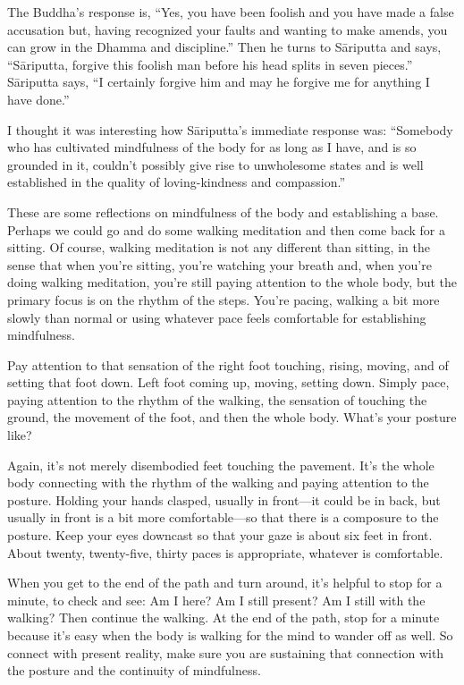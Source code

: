 The Buddha’s response is, “Yes, you have been foolish and you have made
a false accusation but, having recognized your faults and wanting to
make amends, you can grow in the Dhamma and discipline.” Then he turns
to Sāriputta and says, “Sāriputta, forgive this foolish man before his
head splits in seven pieces.” Sāriputta says, “I certainly forgive him
and may he forgive me for anything I have done.”

I thought it was interesting how Sāriputta’s immediate response was:
“Somebody who has cultivated mindfulness of the body for as long as I
have, and is so grounded in it, couldn’t possibly give rise to
unwholesome states and is well established in the quality of
loving-kindness and compassion.”

These are some reflections on mindfulness of the body and establishing a
base. Perhaps we could go and do some walking meditation and then come
back for a sitting. Of course, walking meditation is not any different
than sitting, in the sense that when you’re sitting, you’re watching
your breath and, when you’re doing walking meditation, you’re still
paying attention to the whole body, but the primary focus is on the
rhythm of the steps. You’re pacing, walking a bit more slowly than
normal or using whatever pace feels comfortable for establishing
mindfulness.

Pay attention to that sensation of the right foot touching, rising,
moving, and of setting that foot down. Left foot coming up, moving,
setting down. Simply pace, paying attention to the rhythm of the
walking, the sensation of touching the ground, the movement of the foot,
and then the whole body. What’s your posture like?

Again, it’s not merely disembodied feet touching the pavement. It’s the
whole body connecting with the rhythm of the walking and paying
attention to the posture. Holding your hands clasped, usually in
front—it could be in back, but usually in front is a bit more
comfortable—so that there is a composure to the posture. Keep your eyes
downcast so that your gaze is about six feet in front. About twenty,
twenty-five, thirty paces is appropriate, whatever is comfortable.

When you get to the end of the path and turn around, it’s helpful to
stop for a minute, to check and see: Am I here? Am I still present? Am I
still with the walking? Then continue the walking. At the end of the
path, stop for a minute because it’s easy when the body is walking for
the mind to wander off as well. So connect with present reality, make
sure you are sustaining that connection with the posture and the
continuity of mindfulness.
